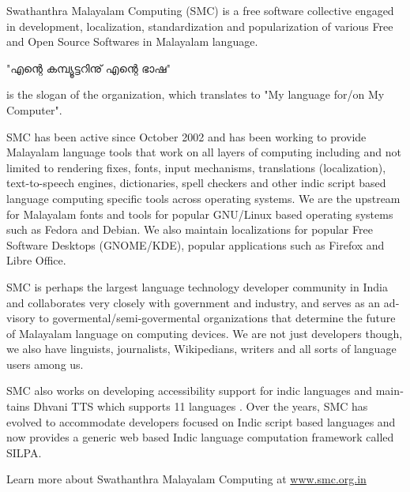 \newpage
\begin{english}

Swathanthra Malayalam Computing (SMC) is a free software collective engaged in development, localization, standardization and popularization of various Free and Open Source Softwares in Malayalam language.\end{english} "എന്റെ കമ്പ്യൂട്ടറിനു് എന്റെ ഭാഷ" \begin{english} is the slogan of the organization, which translates to "My language for/on My Computer".

SMC has been active since October 2002 and has been working to provide Malayalam language tools that work on all layers of computing including and not limited to rendering fixes, fonts, input mechanisms, translations (localization), text-to-speech engines, dictionaries, spell checkers and other indic script based language computing specific tools across operating systems. We are the upstream for Malayalam fonts and tools for popular GNU/Linux based operating systems such as Fedora and Debian. We also maintain localizations for popular Free Software Desktops (GNOME/KDE), popular applications such as Firefox and Libre Office.

SMC is perhaps the largest language technology developer community in India and collaborates very closely with government and industry, and serves as an advisory to govermental/semi-govermental organizations that determine the future of Malayalam language on computing devices. We are not just developers though, we also have linguists, journalists, Wikipedians, writers and all sorts of language users among us.

SMC also works on developing accessibility support for indic languages and maintains Dhvani TTS which supports 11 languages . Over the years, SMC has evolved to accommodate developers focused on Indic script based languages and now provides a generic web based Indic language computation framework called SILPA.

Learn more about Swathanthra Malayalam Computing at \url{www.smc.org.in}
\end{english}
